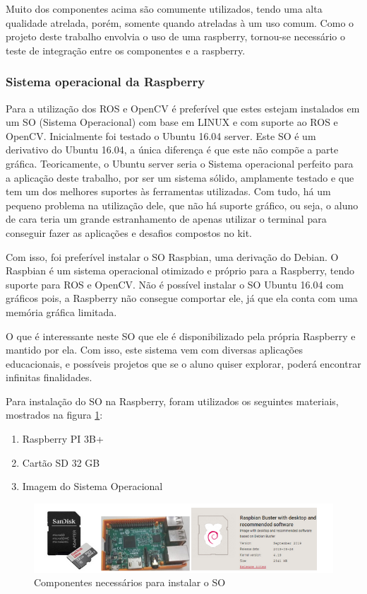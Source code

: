 Muito dos componentes acima são comumente utilizados, tendo uma alta qualidade atrelada, porém, somente quando atreladas à um uso comum. Como o projeto deste trabalho envolvia o uso de uma raspberry, tornou-se necessário o teste de integração entre os componentes e a raspberry.
\subsubsection{Sistema operacional da Raspberry}

Para a utilização dos ROS e OpenCV é preferível que estes estejam instalados em um SO (Sistema Operacional) com base em LINUX e com suporte ao ROS e OpenCV. Inicialmente foi testado o Ubuntu 16.04 server. Este SO é um derivativo do Ubuntu 16.04, a única diferença é que este não compõe a parte gráfica. Teoricamente, o Ubuntu server seria o Sistema operacional perfeito para a aplicação deste trabalho, por ser um sistema sólido, amplamente testado e que tem um dos melhores suportes às ferramentas utilizadas. Com tudo, há um pequeno problema na utilização dele, que não há suporte gráfico, ou seja, o aluno de cara teria um grande estranhamento de apenas utilizar o terminal para conseguir fazer as aplicações e desafios compostos no kit. 

Com isso, foi preferível instalar o SO Raspbian, uma derivação do Debian. O Raspbian é um sistema operacional otimizado e próprio para a Raspberry, tendo suporte para ROS e OpenCV. Não é possível instalar o SO Ubuntu 16.04 com gráficos pois, a Raspberry não consegue comportar ele, já que ela conta com uma memória gráfica limitada.

O que é interessante neste SO que ele é disponibilizado pela própria Raspberry e mantido por ela. Com isso, este sistema vem com diversas aplicações educacionais, e possíveis projetos que se o aluno quiser explorar, poderá encontrar infinitas finalidades.

Para instalação do SO na Raspberry, foram utilizados os seguintes materiais, mostrados na figura \ref{fig:SO}:

\begin{enumerate}
	\item Raspberry PI 3B+
	\item Cartão SD 32 GB
	\item Imagem do Sistema Operacional

\end{enumerate}

\begin{figure}[H]
	\centering
	\includegraphics[scale=0.8, angle=0]{Figures/so.png}
	\caption{Componentes necessários para instalar o SO}
	\label{fig:SO}
\end{figure}

